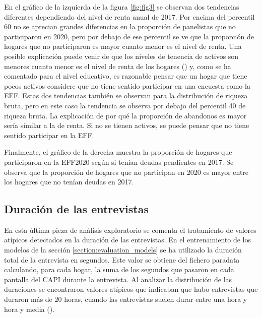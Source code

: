 En el gráfico de la izquierda de la figura \ref{fig:fig3} se observan dos tendencias diferentes dependiendo del nivel de renta anual de 2017. Por encima del percentil 60 no se aprecian grandes diferencias en la proporción de panelistas que no participaron en 2020, pero por debajo de ese percentil se ve que la proporción de hogares que no participaron es mayor cuanto menor es el nivel de renta. Una posible explicación puede venir de que los niveles de tenencia de activos son menores cuanto menor es el nivel de renta de los hogares (\cite{eff2017results}) y, como se ha comentado para el nivel educativo, es razonable pensar que un hogar que tiene pocos activos considere que no tiene sentido participar en una encuesta como la EFF. Estas dos tendencias también se observan para la distribución de riqueza bruta, pero en este caso la tendencia se observa por debajo del percentil 40 de riqueza bruta. La explicación de por qué la proporción de abandonos es mayor sería similar a la de renta. Si no se tienen activos, se puede pensar que no tiene sentido participar en la EFF.

Finalmente, el gráfico de la derecha muestra la proporción de hogares que participaron en la EFF2020 según si tenían deudas pendientes en 2017. Se observa que la proporción de hogares que no participan en 2020 es mayor entre los hogares que no tenían  deudas en 2017.

\subsection*{Duración de las entrevistas}

En esta última pieza de análisis exploratorio se comenta el tratamiento de valores atípicos detectados en la duración de las entrevistas. En el entrenamiento de los modelos de la sección \ref{section:evaluation_models} se ha utilizado la duración total de la entrevista en segundos. Este valor se obtiene del fichero paradata calculando, para cada hogar, la suma de los segundos que pasaron en cada pantalla del CAPI durante la entrevista. Al analizar la distribución de las duraciones se encontraron valores atípicos que indicaban que hubo entrevistas que duraron más de 20 horas, cuando las entrevistas suelen durar entre una hora y hora y media (\cite{effmethod2017}).

